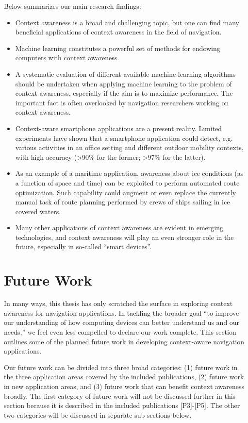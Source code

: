 Below summarizes our main research findings:
%
\begin{itemize}
\item Context awareness is a broad and challenging topic, but one can find many beneficial applications of context awareness in the field of navigation.
\item Machine learning constitutes a powerful set of methods for endowing computers with context awareness.
\item A systematic evaluation of different available machine learning algorithms should be undertaken when applying machine learning to the problem of context awareness, especially if the aim is to maximize performance. The important fact is often overlooked by navigation researchers working on context awareness.
\item Context-aware smartphone applications are a present reality. Limited experiments have shown that a smartphone application could detect, e.g. various activities in an office setting and different outdoor mobility contexts, with high accuracy (>90\% for the former; >97\% for the latter).
\item As an example of a maritime application, awareness about ice conditions (as a function of space and time) can be exploited to perform automated route optimization. Such capability could augment or even replace the currently manual task of route planning performed by crews of ships sailing in ice covered waters.
\item Many other applications of context awareness are evident in emerging technologies, and context awareness will play an even stronger role in the future, especially in so-called ``smart devices''.

\end{itemize}

\section{Future Work}
\label{sec:future_work}

In many ways, this thesis has only scratched the surface in exploring context awareness for navigation applications. In tackling the broader goal ``to improve our understanding of how computing devices can better understand us and our needs,'' we feel even less compelled to declare our work complete. This section outlines some of the planned future work in developing context-aware navigation applications.

Our future work can be divided into three broad categories: (1) future work in the three application areas covered by the included publications, (2) future work in new application areas, and (3) future work that can benefit context awareness broadly. The first category of future work will not be discussed further in this section because it is described in the included publications [P3]-[P5]. The other two categories will be discussed in separate sub-sections below.

